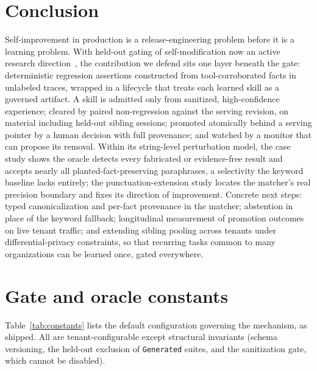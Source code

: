 \documentclass{article}
\newcommand{\code}[1]{\texttt{\small #1}}
\begin{document}
\section{Conclusion}
\label{sec:conclusion}

Self-improvement in production is a release-engineering problem before it is a learning problem. With held-out gating of self-modification now an active research direction~\citep{moll2026grasp, yang2026skillopt, zhang2026selfharness}, the contribution we defend sits one layer beneath the gate: deterministic regression assertions constructed from tool-corroborated facts in unlabeled traces, wrapped in a lifecycle that treats each learned skill as a governed artifact. A skill is admitted only from sanitized, high-confidence experience; cleared by paired non-regression against the serving revision, on material including held-out sibling sessions; promoted atomically behind a serving pointer by a human decision with full provenance; and watched by a monitor that can propose its removal. Within its string-level perturbation model, the case study shows the oracle detects every fabricated or evidence-free result and accepts nearly all planted-fact-preserving paraphrases, a selectivity the keyword baseline lacks entirely; the punctuation-extension study locates the matcher's real precision boundary and fixes its direction of improvement. Concrete next steps: typed canonicalization and per-fact provenance in the matcher; abstention in place of the keyword fallback; longitudinal measurement of promotion outcomes on live tenant traffic; and extending sibling pooling across tenants under differential-privacy constraints, so that recurring tasks common to many organizations can be learned once, gated everywhere.




\appendix

\section{Gate and oracle constants}
\label{app:constants}

Table~\ref{tab:constants} lists the default configuration governing the mechanism, as shipped. All are tenant-configurable except structural invariants (schema versioning, the held-out exclusion of \code{Generated} suites, and the sanitization gate, which cannot be disabled).
\end{document}
